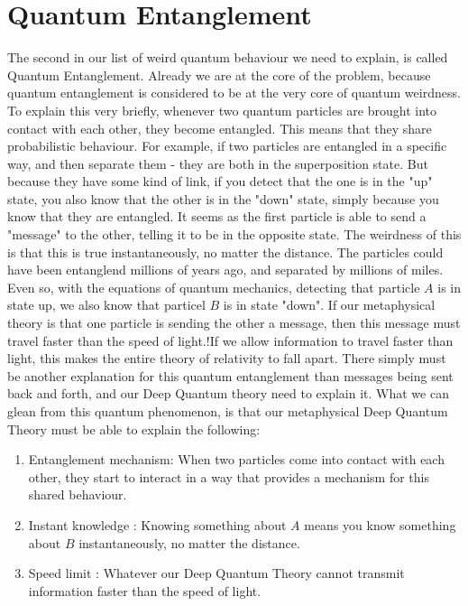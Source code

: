 \documentclass[notitlepage]{report}
\begin{document}
\section*{Quantum Entanglement}
The second in our list of weird quantum behaviour we need to explain, is called Quantum Entanglement. Already we are at the core of the problem, because quantum entanglement is considered to be at the very  core of quantum weirdness. To explain this very briefly, whenever two quantum particles are brought into contact with each other, they become entangled. This means that they share probabilistic behaviour. For example, if two particles are entangled in a specific way, and then separate them - they are both in the superposition state. But because they have some kind of link, if you detect that the one is in the "up" state, you also know that the other is in the "down" state, simply because you know that they are entangled. It seems as the first particle is able to send a "message" to the other, telling it to be in the opposite state. The weirdness of this is that this is true instantaneously, no matter the distance. The particles could have been entanglend millions of years ago, and separated by millions of miles. Even so, with the equations of quantum mechanics, detecting that particle $A$ is in state up, we also know that particel $B$ is in state "down". If our metaphysical theory is that one particle is sending the other a message, then this message must travel faster than the speed of light.!If we allow information to travel faster than light, this makes the entire theory of relativity to fall apart. There simply must be another explanation for this quantum entanglement than messages being sent back and forth, and our Deep Quantum theory need to explain it.
What we can glean from this quantum phenomenon, is that our metaphysical Deep Quantum Theory must be able to explain the following:

\begin{enumerate}
\item Entanglement mechanism: When two particles come into contact with each other, they start to interact in a way that provides a mechanism for this shared behaviour. 
\item Instant knowledge : Knowing something about $A$ means you know something about $B$ instantaneously, no matter the distance.
\item  Speed limit : Whatever our Deep Quantum Theory cannot transmit information faster than the speed of light. 
\end{enumerate}
\end{document}
